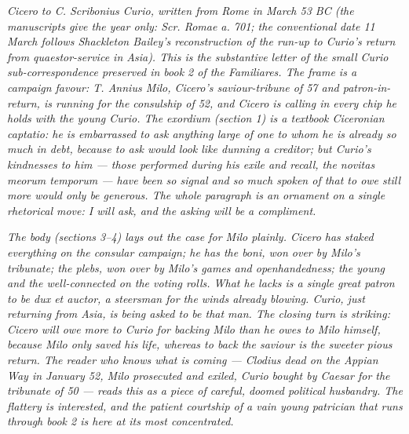 
\textit{Cicero to C. Scribonius Curio, written from Rome in
March 53 BC (the manuscripts give the year only: \textit{Scr.
Romae a. 701}; the conventional date 11 March follows
Shackleton Bailey's reconstruction of the run-up to Curio's
return from quaestor-service in Asia). This is the substantive
letter of the small Curio sub-correspondence preserved in book
2 of the \textit{Familiares}. The frame is a campaign favour:
T. Annius Milo, Cicero's saviour-tribune of 57 and patron-in-
return, is running for the consulship of 52, and Cicero is
calling in every chip he holds with the young Curio. The
\textit{exordium} (section 1) is a textbook Ciceronian
captatio: he is embarrassed to ask anything large of one to
whom he is already so much in debt, because to ask would look
like dunning a creditor; but Curio's kindnesses to him --- those
performed during his exile and recall, the \textit{novitas
meorum temporum} --- have been so signal and so much spoken of
that to owe still more would only be generous. The whole
paragraph is an ornament on a single rhetorical move: I will
ask, and the asking will be a compliment.}

\textit{The body (sections 3--4) lays out the case for Milo
plainly. Cicero has staked everything on the consular campaign;
he has the \textit{boni}, won over by Milo's tribunate; the
\textit{plebs}, won over by Milo's games and openhandedness;
the young and the well-connected on the voting rolls. What he
lacks is a single great patron to be \textit{dux et auctor}, a
steersman for the winds already blowing. Curio, just returning
from Asia, is being asked to be that man. The closing turn is
striking: Cicero will owe more to Curio for backing Milo than
he owes to Milo himself, because Milo only saved his life,
whereas to back the saviour is the sweeter pious return. The
reader who knows what is coming --- Clodius dead on the Appian
Way in January 52, Milo prosecuted and exiled, Curio bought by
Caesar for the tribunate of 50 --- reads this as a piece of
careful, doomed political husbandry. The flattery is
interested, and the patient courtship of a vain young patrician
that runs through book 2 is here at its most concentrated.}
